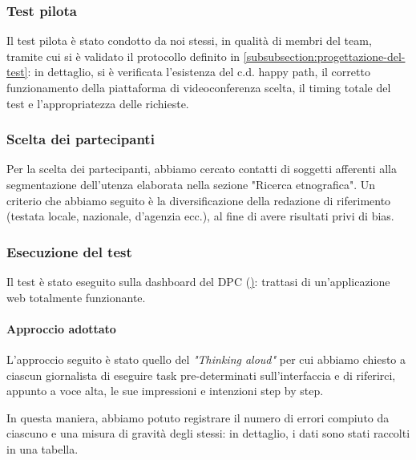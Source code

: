 \subsubsection{Test pilota}
Il test pilota è stato condotto da noi stessi, in qualità di membri del team, tramite cui si è validato il protocollo definito in \ref{subsubsection:progettazione-del-test}: in dettaglio, si è verificata l'esistenza del c.d. happy path, il corretto funzionamento della piattaforma di videoconferenza scelta, il timing totale del test e l'appropriatezza delle richieste.

\subsubsection{Scelta dei partecipanti}
Per la scelta dei partecipanti, abbiamo cercato contatti di soggetti afferenti alla segmentazione dell'utenza elaborata nella sezione "Ricerca etnografica". Un criterio che abbiamo seguito è la diversificazione della redazione di riferimento (testata locale, nazionale, d'agenzia ecc.), al fine di avere risultati privi di bias.

\subsubsection{Esecuzione del test}
Il test è stato eseguito sulla dashboard del DPC (\href{https://opendatadpc.maps.arcgis.com/apps/opsdashboard/index.html#/b0c68bce2cce478eaac82fe38d4138b1}): trattasi di un'applicazione web totalmente funzionante.
\paragraph{Approccio adottato}
L'approccio seguito è stato quello del \textit{"Thinking aloud"} per cui abbiamo chiesto a ciascun giornalista di eseguire task pre-determinati sull'interfaccia e di riferirci, appunto a voce alta, le sue impressioni e intenzioni step by step.

In questa maniera, abbiamo potuto registrare il numero di errori compiuto da ciascuno e una misura di gravità degli stessi: in dettaglio, i dati sono stati raccolti in una tabella.

